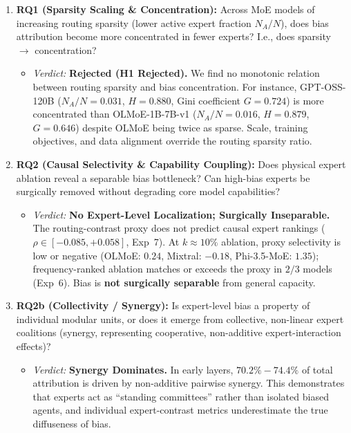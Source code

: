 \documentclass[11pt,a4paper]{article}
\begin{document}
\begin{enumerate}
    \item \textbf{RQ1 (Sparsity Scaling \& Concentration):} Across MoE models of increasing routing sparsity (lower active expert fraction $N_A/N$), does bias attribution become more concentrated in fewer experts? I.e., does sparsity $\rightarrow$ concentration?
    \begin{itemize}
        \item \textit{Verdict:} \textbf{Rejected (H1 Rejected).} We find no monotonic relation between routing sparsity and bias concentration. For instance, GPT-OSS-120B ($N_A/N = 0.031$, $H = 0.880$, Gini coefficient $G = 0.724$) is more concentrated than OLMoE-1B-7B-v1 ($N_A/N = 0.016$, $H = 0.879$, $G = 0.646$) despite OLMoE being twice as sparse. Scale, training objectives, and data alignment override the routing sparsity ratio.
    \end{itemize}
    
    \item \textbf{RQ2 (Causal Selectivity \& Capability Coupling):} Does physical expert ablation reveal a separable bias bottleneck? Can high-bias experts be surgically removed without degrading core model capabilities?
    \begin{itemize}
        \item \textit{Verdict:} \textbf{No Expert-Level Localization; Surgically Inseparable.} The routing-contrast proxy does not predict causal expert rankings ($\rho \in [-0.085, +0.058]$, Exp~7). At $k \approx 10\%$ ablation, proxy selectivity is low or negative (OLMoE: $0.24$, Mixtral: $-0.18$, Phi-3.5-MoE: $1.35$); frequency-ranked ablation matches or exceeds the proxy in $2/3$ models (Exp~6). Bias is \textbf{not surgically separable} from general capacity.
    \end{itemize}
    
    \item \textbf{RQ2b (Collectivity / Synergy):} Is expert-level bias a property of individual modular units, or does it emerge from collective, non-linear expert coalitions (synergy, representing cooperative, non-additive expert-interaction effects)?
    \begin{itemize}
        \item \textit{Verdict:} \textbf{Synergy Dominates.} In early layers, $70.2\% - 74.4\%$ of total attribution is driven by non-additive pairwise synergy. This demonstrates that experts act as ``standing committees'' rather than isolated biased agents, and individual expert-contrast metrics underestimate the true diffuseness of bias.
    \end{itemize}
    

\end{enumerate}
\end{document}

